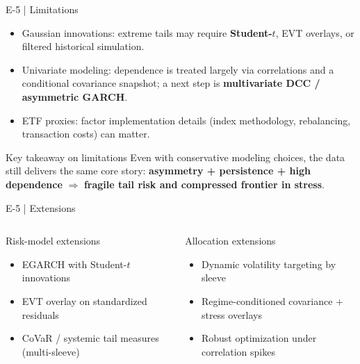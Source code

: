 \documentclass[aspectratio=169,10pt]{beamer}
\newcommand{\kpi}[1]{\textbf{\color{blue}#1}}
\begin{document}
\begin{frame}{E-5 | Limitations}
\small
\begin{itemize}
  \item Gaussian innovations: extreme tails may require \kpi{Student-$t$}, EVT overlays, or filtered historical simulation.
  \item Univariate modeling: dependence is treated largely via correlations and a conditional covariance snapshot; a next step is \kpi{multivariate DCC / asymmetric GARCH}.
  \item ETF proxies: factor implementation details (index methodology, rebalancing, transaction costs) can matter.
\end{itemize}

\begin{block}{Key takeaway on limitations}
Even with conservative modeling choices, the data still delivers the same core story:
\textbf{asymmetry + persistence + high dependence} $\Rightarrow$ \textbf{fragile tail risk and compressed frontier in stress}.
\end{block}
\end{frame}

\begin{frame}{E-5 | Extensions}
\small
\begin{columns}[T,onlytextwidth]
\begin{block}{Risk-model extensions}
\begin{itemize}
  \item EGARCH with Student-$t$ innovations
  \item EVT overlay on standardized residuals
  \item CoVaR / systemic tail measures (multi-sleeve)
\end{itemize}
\end{block}

\begin{block}{Allocation extensions}
\begin{itemize}
  \item Dynamic volatility targeting by sleeve
  \item Regime-conditioned covariance + stress overlays
  \item Robust optimization under correlation spikes
\end{itemize}
\end{block}
\end{columns}
\end{frame}
\end{document}

